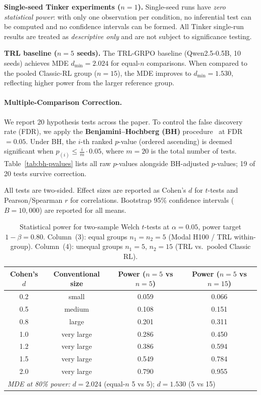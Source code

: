 \documentclass{article}
\begin{document}
\textbf{Single-seed Tinker experiments ($n = 1$).}
Single-seed runs have \emph{zero statistical power}: with only one observation per
condition, no inferential test can be computed and no confidence intervals can be
formed.  All Tinker single-run results are treated as \emph{descriptive only} and
are not subject to significance testing.

\textbf{TRL baseline ($n = 5$ seeds).}
The TRL-GRPO baseline (Qwen2.5-0.5B, 10 seeds) achieves MDE
$d_{\min} = 2.024$ for equal-$n$ comparisons.
When compared to the pooled Classic-RL group ($n = 15$), the MDE
improves to $d_{\min} = 1.530$,
reflecting higher power from the larger reference group.

\paragraph{Multiple-Comparison Correction.}
We report 20 hypothesis tests across the paper.
To control the false discovery rate (FDR), we apply the
\textbf{Benjamini--Hochberg (BH)} procedure~\cite{benjamini1995controlling}
at FDR $= 0.05$.  Under BH, the $i$-th ranked $p$-value (ordered ascending)
is deemed significant when $p_{(i)} \le \frac{i}{m} \cdot 0.05$,
where $m = 20$ is the total number of tests.
Table~\ref{tab:bh-pvalues} lists all raw $p$-values alongside BH-adjusted
$p$-values; 19 of 20 tests
survive correction.

All tests are two-sided.  Effect sizes are reported as Cohen's $d$ for
$t$-tests and Pearson/Spearman $r$ for correlations.  Bootstrap 95\%
confidence intervals ($B = 10{,}000$) are reported for all means.

\begin{table}[!ht]
\centering
\caption{Statistical power for two-sample Welch $t$-tests at $\alpha = 0.05$,
         power target $1{-}\beta = 0.80$.
         Column~(3): equal groups $n_1 = n_2 = 5$ (Modal H100 / TRL within-group).
         Column~(4): unequal groups $n_1 = 5$, $n_2 = 15$ (TRL vs.\ pooled Classic RL).}
\label{tab:power-analysis}
\small
\begin{tabular}{@{}cccc@{}}
\toprule
Cohen's $d$ & Conventional size & Power ($n{=}5$ vs $n{=}5$) & Power ($n{=}5$ vs $n{=}15$) \\
\midrule
        0.2 & small & 0.059 & 0.066 \\
        0.5 & medium & 0.108 & 0.151 \\
        0.8 & large & 0.201 & 0.311 \\
        1.0 & very large & 0.286 & 0.450 \\
        1.2 & very large & 0.386 & 0.594 \\
        1.5 & very large & 0.549 & 0.784 \\
        2.0 & very large & 0.790 & 0.955 \\
\midrule
\multicolumn{4}{l}{\textit{MDE at 80\% power:} $d = 2.024$ (equal-$n$ 5 vs 5);\; $d = 1.530$ (5 vs 15)} \\
\bottomrule
\end{tabular}
\end{table}
\end{document}

